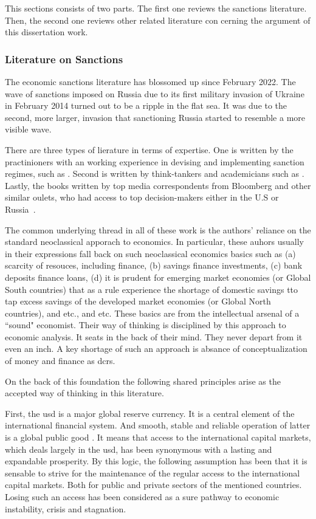 This sections consists of two parts. The first one reviews the sanctions literature. Then, the second one reviews other related literature con cerning the argument of this dissertation work.

\subsubsection*{Literature on Sanctions}

The economic sanctions literature has blossomed up since February 2022. The wave of sanctions imposed on Russia due to its first military invasion of Ukraine in February 2014 turned out to be a ripple in the flat sea. It was due to the second, more larger, invasion that sanctioning Russia started to resemble a more visible wave.

There are three types of lierature in terms of expertise. One is written by the practinioners with an working experience in devising and implementing sanction regimes, such as \citep{zarate2013,lew2016,nephew2017,lew2018,fishman2025}. Second is written by think-tankers and academicians such as \citep{blackwill,mulder,demarais2022,mcdowell,farrell2019,farrell2023}. Lastly, the books written by top media correspondents from Bloomberg and other similar oulets, who had access to top decision-makers either in the U.S or Russia~\citep{mohsin2024,baker2024}. 

The common underlying thread in all of these work is the authors' reliance on the standard neoclassical apporach to economics. In particular, these auhors usually in their expressions fall back on such neoclassical economics basics such as (a) scarcity of resouces, including finance, (b) savings finance investments, (c) bank deposits finance loans, (d) it is prudent for emerging market economies (or Global South countries) that as a rule experience the shortage of domestic savings tto tap excess savings of the developed market economies (or Global North countries), and etc., and etc. These basics are from the intellectual arsenal of a ``sound" economist. Their way of thinking is disciplined by this approach to economic analysis. It seats in the back of their mind. They never depart from it even an inch. A key shortage of such an approach is absance of conceptualization of money and finance as \acfp{dcr}.

On the back of this foundation the following shared principles arise as the accepted way of thinking in this literature. 

First, the \acf{usd} is a major global reserve currency. It is a central element of the international financial system. And smooth, stable and reliable operation of latter is a global public good \citep{imf1999}. It means that access to the international capital markets, which deals largely in the \acf{usd}, has been synonymous with a lasting and expandable prosperity. By this logic, the following assumption has been that it is sensable to strive for the maintenance of the regular access to the international capital markets. Both for public and private sectors of the mentioned countries. Losing such an access has been considered as a sure pathway to economic instability, crisis and stagnation.

